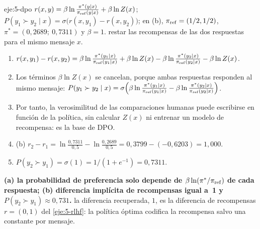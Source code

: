\begin{solucion}{eje:5-dpo}
\datos $r(x,y)=\beta\ln\frac{\pi^{*}(y\mid x)}{\pi_{\mathrm{ref}}(y\mid x)}+\beta\ln Z(x)$; $P(y_1\succ y_2\mid x)=\sigma\bigl(r(x,y_1)-r(x,y_2)\bigr)$; en (b), $\pi_{\mathrm{ref}}=(1/2,1/2)$, $\pi^{*}=(0{,}2689;\ 0{,}7311)$ y $\beta=1$.
\planteamiento restar las recompensas de las dos respuestas para el mismo mensaje $x$.
\pasos
\begin{enumerate}[label=\arabic*.]
  \item $r(x,y_1)-r(x,y_2)=\beta\ln\frac{\pi^{*}(y_1\mid x)}{\pi_{\mathrm{ref}}(y_1\mid x)}+\beta\ln Z(x)-\beta\ln\frac{\pi^{*}(y_2\mid x)}{\pi_{\mathrm{ref}}(y_2\mid x)}-\beta\ln Z(x)$.
  \item Los términos $\beta\ln Z(x)$ se cancelan, porque ambas respuestas responden al mismo mensaje:
  $P(y_1\succ y_2\mid x)=\sigma\Bigl(\beta\ln\frac{\pi^{*}(y_1\mid x)}{\pi_{\mathrm{ref}}(y_1\mid x)}-\beta\ln\frac{\pi^{*}(y_2\mid x)}{\pi_{\mathrm{ref}}(y_2\mid x)}\Bigr)$.
  \item Por tanto, la verosimilitud de las comparaciones humanas puede escribirse en función de la política, sin calcular $Z(x)$ ni entrenar un modelo de recompensa: es la base de DPO.
  \item (b) $r_2-r_1=\ln\frac{0{,}7311}{0{,}5}-\ln\frac{0{,}2689}{0{,}5}=0{,}3799-(-0{,}6203)=1{,}000$.
  \item $P(y_2\succ y_1)=\sigma(1)=1/(1+e^{-1})=0{,}7311$.
\end{enumerate}
\resultado \textbf{(a) la probabilidad de preferencia solo depende de $\beta\ln(\pi^{*}/\pi_{\mathrm{ref}})$ de cada respuesta; (b) diferencia implícita de recompensas igual a~1 y $P(y_2\succ y_1)\approx 0{,}731$.}
\comprobacion la diferencia recuperada, $1$, es la diferencia de recompensas $r=(0,1)$ del \cref{eje:5-rlhf}: la política óptima codifica la recompensa salvo una constante por mensaje.
\end{solucion}
